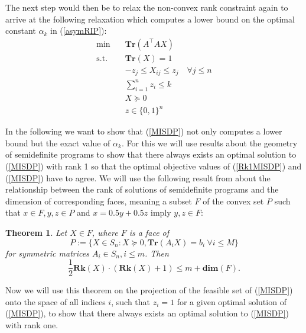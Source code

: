 \documentclass{elsarticle}
\newtheorem{thm}{Theorem}
\newcommand{\T}{^{\top}}
\begin{document}
The next step would then be to relax the non-convex rank constraint again to arrive at the following relaxation which computes a lower bound on the optimal constant $\alpha_k$ in (\ref{asymRIP}):
\begin{align}\label{MISDP}
 \text{min} \quad & \textbf{Tr}(A\T A X) \nonumber \\
 \text{s.t.} \quad & \textbf{Tr}(X) = 1 \nonumber \\
 & -z_j \leq X_{ij} \leq z_j \quad \forall j \leq n \nonumber \\
 & \sum_{i=1}^n z_i \leq k \tag{MISDP} \\
 & X \succeq 0  \nonumber \\
 & z \in \{0,1\}^n \nonumber
\end{align}

In the following we want to show that (\ref{MISDP}) not only computes a lower bound but the exact value of $\alpha_k$. For this we will use results about the geometry of semidefinite programs to show that there always exists an 
optimal solution to (\ref{MISDP}) with rank 1 so that the optimal objective values of (\ref{Rk1MISDP}) and (\ref{MISDP}) have to agree. We will use the following result from \cite{pat98} about the relationship between the rank of
solutions of semidefinite programs and the dimension of corresponding faces, meaning a subset $F$ of the convex set $P$ such that $x \in F, y, z \in P$ and $x = 0.5y + 0.5z$ imply $y,z \in F$:

\begin{thm}\label{patakiLemma}
 Let $X \in F$, where $F$ is a face of
 \begin{equation*}
 P := \{X \in S_n : X \succeq 0, \textbf{Tr}(A_i X) = b_i \ \forall i \leq M\}
 \end{equation*}
 for symmetric matrices $A_i \in S_n, i \leq m$. Then
 \begin{equation*}
  \frac{1}{2}\textbf{Rk}(X)\cdot(\textbf{Rk}(X)+1) \leq m + \textbf{dim}(F).
 \end{equation*}
\end{thm}

Now we will use this theorem on the projection of the feasible set of (\ref{MISDP}) onto the space of all indices $i$, such that $z_i = 1$ for a given optimal solution of (\ref{MISDP}), to show that there always exists an optimal 
solution to (\ref{MISDP}) with rank one.
\end{document}
